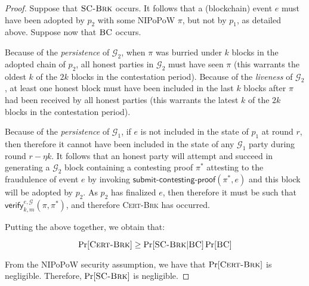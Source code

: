 \begin{proof}
  Suppose that $\textsc{SC-Brk}$ occurs. It follows that a (blockchain) event
  $e$ must have been adopted by $p_2$ with some NIPoPoW $\pi$, but not by $p_1$,
  as detailed above. Suppose now that $\textsc{BC}$ occurs.

  Because of the \emph{persistence} of $\mathcal{G}_2$, when $\pi$ was burried
  under $k$ blocks in the adopted chain of $p_2$, all honest parties in
  $\mathcal{G}_2$ must have seen $\pi$ (this warrants the oldest $k$ of the $2k$
  blocks in the contestation period). Because of the \emph{liveness} of
  $\mathcal{G}_2$, at least one honest block must have been included in the last
  $k$ blocks after $\pi$ had been received by all honest parties (this warrants
  the latest $k$ of the $2k$ blocks in the contestation period).

  Because of the \emph{persistence} of $\mathcal{G}_1$, if $e$ is not included
  in the state of $p_1$ at round $r$, then therefore it cannot have been
  included in the state of any $\mathcal{G}_1$ party during round $r - \eta k$.
  It follows that an honest party will attempt and succeed in generating a
  $\mathcal{G}_2$ block containing a contesting proof $\pi^*$ attesting to the
  fraudulence of event $e$ by invoking
  $\textsf{submit-contesting-proof}(\pi^*, e)$ and this block will be adopted by
  $p_2$. As $p_2$ has finalized $e$, then therefore it must be such that
  $\textsf{verify}^{e, \mathcal{G}}_{k,m}(\pi, \pi^*)$, and therefore
  \textsc{Cert-Brk} has occurred.

  Putting the above together, we obtain that:

  \[
  \Pr[\textsc{Cert-Brk}] \geq \Pr[\textsc{SC-Brk}|\textsc{BC}]\Pr[\textsc{BC}]
  \]

  From the NIPoPoW security assumption, we have that $\Pr[\textsc{Cert-Brk}]$ is
  negligible. Therefore, $\Pr[\textsc{SC-Brk}]$ is negligible.
\end{proof}
